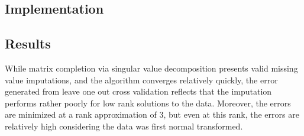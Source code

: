 \documentclass[12pt,twoside]{dukestatscithesis}
\theoremstyle{definition}
\theoremstyle{definition}
\theoremstyle{definition}
\theoremstyle{remark}
\begin{document}
\subsection{Implementation}\label{implementation-2}
\begin{Shaded}
\begin{Highlighting}[]
\StringTok{ } \NormalTok{, } \NormalTok{, }  
  \StringTok{ }
  \StringTok{ }
  \StringTok{ }
      \StringTok{ }\NormalTok{)\{}
        \StringTok{ }\StringTok{ }
        \StringTok{ }
        \StringTok{ }
        \StringTok{ }
        \StringTok{ }\StringTok{ }\StringTok{ }
        \StringTok{ }\StringTok{ }\StringTok{ }
      \NormalTok{\}}
    \NormalTok{\}}
  \NormalTok{\}}
  \StringTok{ }
   \NormalTok{(}\NormalTok{(}   
\NormalTok{\}}
\end{Highlighting}
\end{Shaded}
\subsection{Results}\label{results}

While matrix completion via singular value decomposition presents valid
missing value imputations, and the algorithm converges relatively
quickly, the error generated from leave one out cross validation
reflects that the imputation performs rather poorly for low rank
solutions to the data. Moreover, the errors are minimized at a rank
approximation of 3, but even at this rank, the errors are relatively
high considering the data was first normal transformed.
\end{document}
